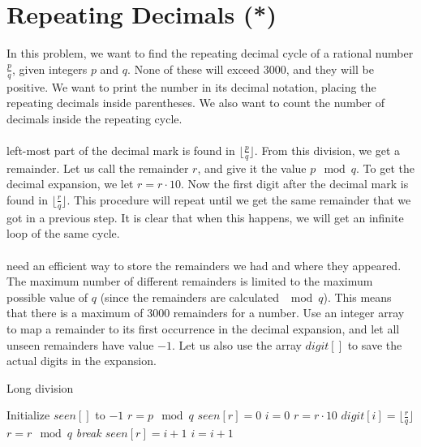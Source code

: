 \documentclass[11pt,a4paper,twoside]{article}
\begin{document}
\section{Repeating Decimals (*)}

In this problem, we want to find the repeating decimal cycle of a rational
number $\frac{p}{q}$, given integers $p$ and $q$. None of these will exceed
$3000$, and they will be positive. We want to print the number in its decimal
notation, placing the repeating decimals inside parentheses. We also want to
count the number of decimals inside the repeating cycle.
\\\\
 left-most part of the decimal mark is found in
$\lfloor{\frac{p}{q}}\rfloor$. From this division, we get a remainder. Let us call
the remainder $r$, and give it the value $p \mod q$. To get the decimal expansion,
we let $r = r \cdot 10$. Now the first digit after the decimal mark is found in
$\lfloor{\frac{r}{q}}\rfloor$. This procedure will repeat until we get the same
remainder that we got in a previous step. It is clear that when this happens, we
will get an infinite loop of the same cycle.
\\\\
 need an efficient way to store the remainders we had and where they
appeared. The maximum number of different remainders is limited to the maximum
possible value of $q$ (since the remainders are calculated $\mod q$). This means
that there is a maximum of $3000$ remainders for a number. Use an integer array to
map a remainder to its first occurrence in the decimal expansion, and let all unseen
remainders have value $-1$.  Let us also use the array $digit[]$ to save the actual
digits in the expansion.


\begin{algorithm}
    \caption{Long division}
    \label{lst:Long division}
    \begin{algorithmic}
        \STATE Initialize $seen[]$ to $-1$
        \STATE $r = p \mod q$
        \STATE $seen[r] = 0$ 
        \STATE $i = 0$
            \STATE $r = r \cdot 10$
            \STATE $digit[i] = \lfloor\frac{r}{q}\rfloor$
            \STATE $r = r \mod q$
                \STATE {}
                \STATE \em{break} %
            \ENDIF
            \STATE $seen[r] = i + 1 $
            \STATE $ i = i + 1$
        \ENDWHILE
    \end{algorithmic}
\end{algorithm}
\end{document}
